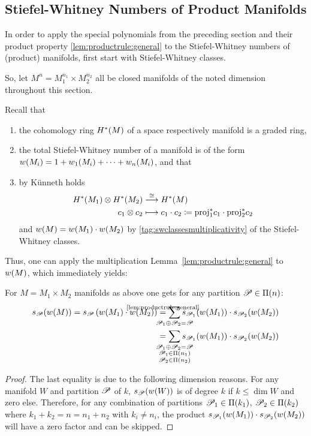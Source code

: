 \subsection{Stiefel-Whitney Numbers of Product Manifolds}
\label{sec:swnumsofproductmfds}
In order to apply the special polynomials from the preceding section
and their product property \autoref{lem:productrule:general} to
the Stiefel-Whitney numbers of (product) manifolds, first start with
Stiefel-Whitney classes.

So, let $M^n=M_1^{n_1}\times M_2^{n_2}$ all be closed manifolds of the
noted dimension throughout this section.

Recall that
\begin{enumerate}
\item the cohomology ring $H^*(M)$ of a space respectively
  manifold is a graded ring,
\item the total Stiefel-Whitney number of a manifold is of the form
  ${w}(M_i) = 1 + {w_{1}}(M_i) + \dotsb + {w_{n}}(M_i)$, and that
\item by Künneth holds
  \begin{align*}
    H^*(M_1)\otimes H^*(M_2)
    &\overset{\cong}{\longrightarrow} H^*(M)
    \\
    c_1 \otimes c_2
    &\longmapsto c_1\cdot c_2
      \coloneqq {\mathrm{proj}}^*_1 c_1 \cdot {\mathrm{proj}}^*_2 c_2
  \end{align*}
  and ${w}(M) = {w}(M_1) \cdot {w}(M_2)$ by
  \ref{tag:swclassesmultiplicativity} of the Stiefel-Whitney classes.
\end{enumerate}
Thus, one can apply the multiplication
Lemma~\autoref{lem:productrule:general} to ${w}(M)$, which immediately
yields:
\begin{Cor}\label{cor:productrule:swcl}
  For $M=M_1\times M_2$ manifolds as above one gets for any partition
  $\mathscr{P}\in\Pi({n})$:
  \begin{align*}
    \s{\Part}(\W{M})
    =
    \s{\Part}\left(\W{M_1}\cdot \W{M_2}\right)
    &\cequalsby{\autoref{lem:productrule:general}}
      \sum_{\mathclap{\Part_1\concat\Part_2=\Part}}
      \s{\Part_1}(\W{M_1}) \cdot \s{\Part_2}(\W{M_2})
    \\ &=
         \sum_{\mathclap{\substack{
         \Part_1\concat\Part_2=\Part\\
    \Part_1\in\PartitionsOf{n_1}\\
    \Part_2\in\PartitionsOf{n_2}\\
    }}}
    \s{\Part_1}(\W{M_1}) \cdot \s{\Part_2}(\W{M_2})
  \end{align*}
  \begin{proof}
    The last equality is due to the following dimension reasons.
    For any manifold $W$ and partition $\mathscr{P}$ of $k$,
    $s_{\mathscr{P}}({w}(W))$ is of degree $k$ if $k\leq\dim W$ and zero else.
    Therefore, for any combination of partitions
    $\mathscr{P}_1\in\Pi({k_1})$,
    $\mathscr{P}_2\in\Pi({k_2})$
    where $k_1+k_2=n=n_1+n_2$ with $k_i\neq n_i$, the product
    $s_{\mathscr{P}_1}({w}(M_1))\cdot s_{\mathscr{P}_2}({w}(M_2))$ will have a zero
    factor and can be skipped.
  \end{proof}
\end{Cor}

